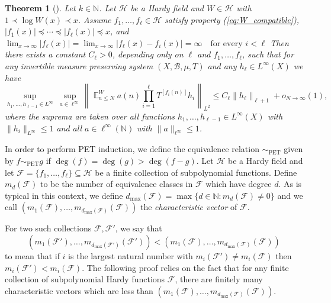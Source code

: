 \documentclass[12pt]{article}
\theoremstyle{plain} %
\newtheorem{theorem}{Theorem}[section]
\theoremstyle{definition} %
\theoremstyle{plain}
\theoremstyle{plain}
\numberwithin{equation}{section}
\newcommand{\N}{\mathbb{N}}
\renewcommand{\leq}{\leqslant}
\renewcommand{\subset}{\subseteq}
\newcommand{\1}{\mathbbm{1}}
\newcommand{\E}{\operatorname{\mathbb{E}}}
\newcommand{\psim}{\sim_{\text{PET}}}
\begin{document}
\begin{theorem}[{\cite[Theorem 4.3]{BMR24}}]\label{thm:BMR24_sublinear}
Let $k \in \mathbb{N}$.
Let $\mathcal{H}$ be a Hardy field and $W \in \mathcal{H}$ with
$1 \prec \log W(x)\prec x$.
Assume $f_1,\ldots,f_{\ell} \in \mathcal{H}$ satisfy property (\ref{eq:W_compatible}),
$|f_1(x)| \preceq \cdots \preceq |f_{\ell}(x)| \preceq x$, and $\lim_{x\to\infty} |f_{\ell}(x)|
=
\lim_{x\to\infty} |f_{\ell}(x)-f_i(x)|
=
\infty
\quad \text{for every } i<\ell$
Then there exists a constant $C_{\ell}>0$, depending only on
$\ell$ and $f_1,\ldots,f_{\ell}$, such that for any invertible
measure preserving system $(X,\mathcal{B},\mu,T)$ and any $h_{\ell}\in L^\infty(X)$ we have
\begin{equation}
\sup_{h_1,\ldots,h_{\ell-1}\in L^\infty}
\ \sup_{a\in \ell^\infty}
\left\|
\E_{n\leq N}^Wa(n)
\prod_{i=1}^{\ell} T^{[f_i(n)]}h_i
\right\|_{L^2}
\le
C_{\ell} \|h_{\ell}\|_{\ell+1}
+
o_{N\to\infty}(1),
\end{equation}
where the suprema are taken over all functions
$h_1,\ldots,h_{\ell-1}\in L^\infty(X)$ with
$\|h_i\|_{L^\infty}\le 1$
and all $a\in \ell^\infty(\mathbb{N})$ with
$\|a\|_{\ell^\infty}\le 1$.
\end{theorem}

In order to perform PET induction, we define the equivalence relation $\psim$  given by $f\psim g$ if $\deg(f) = \deg (g) > \deg(f-g)$. Let $\mathcal{H}$ be a Hardy field and let $\mathscr{F} = \{f_1,\dots, f_{\ell}\}\subset \mathcal{H}$ be a finite collection of subpolynomial functions. Define $m_d(\mathscr{F})$ to be the number of equivalence classes in $\mathscr{F}$ which have degree $d$. As is typical in this context, we define $d_{\max}(\mathscr{F}) = \max\{d\in \N: m_{d}(\mathscr{F})\neq 0\}$ and we call $(m_1(\mathscr{F}),\dots, m_{d_{\max}(\mathscr{F})}({\mathscr{F}}))$ the \emph{characteristic vector} of $\mathscr{F}$. 


For two such collections $\mathscr{F},\mathscr{F}'$, we say that 
$$
(m_1(\mathscr{F}'),\dots, m_{d_{\max}(\mathscr{F}')}({\mathscr{F}}'))<(m_1(\mathscr{F}),\dots, m_{d_{\max}(\mathscr{F})}({\mathscr{F}}))
$$
to mean that if $i$ is the largest natural number with $m_i(\mathscr{F}')\neq m_i(\mathscr{F})$ then $m_i(\mathscr{F}')< m_i(\mathscr{F})$. The following proof relies on the fact that for any finite collection of subpolynomial Hardy functions $\mathscr{F}$, there are finitely many characteristic vectors which are less than $(m_1(\mathscr{F}),\dots, m_{d_{\max}(\mathscr{F})}({\mathscr{F}}))$.
\end{document}
